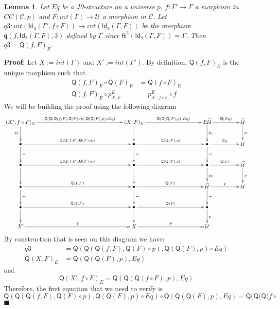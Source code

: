 \documentclass[12pt]{article}
\numberwithin{equation}{section}
\newenvironment{myproof}{{\bf Proof}:}{$\blacksquare$ \vskip 5mm }
\newtheorem{lemma}[proposition]{Lemma}
\newcommand{\llabel}[1]{\label{#1}}
\newcommand{\sr}{\rightarrow}
\newcommand{\wt}{\widetilde}
\newcommand{\BB}{{\bullet}}
\newcommand{\toCC}{CC} %
\newcommand{\C}{{\mathcal C}}  %
\newcommand{\ft}{\mathsf{ft}}
\newcommand{\q}{\mathsf{q}}
\newcommand{\Idx}{\mathsf{Id_3}} %
\newcommand{\U}{\mathcal{U}}
\newcommand{\Q}{\mathsf{Q}}
\begin{document}
\begin{lemma}
\llabel{2015.04.04.l4} Let $Eq$ be a J0-structure on a universe $p$,
$f:\Gamma'\sr \Gamma$ a morphism in $\toCC({\C},p)$ and $F:int(\Gamma)\sr
\U$ a morphism in $\C$.  Let $q3:int(\Idx(\Gamma',f\circ F))\sr
int(\Idx(\Gamma,F))$ be the morphism $\q(f,\Idx(\Gamma,F),3)$ defined by
$\Gamma$ since $\ft^3(\Idx(\Gamma,F))=\Gamma$. Then $q3=\Q(f,F)_{E}$.
\end{lemma}
%
\begin{myproof}
Let $X:=int(\Gamma)$ and $X':=int(\Gamma')$. By definition, $\Q(f,F)_{E}$ is the
unique morphism such that
%
\begin{align*}
  \Q(f,F)_{E}\circ \Q(F)_{E}&=\Q(f\circ F)_{E} \\
  \Q(f,F)_{E}\circ p^{E}_{X,F}&=p^{E}_{X',f\circ F}\circ f
\end{align*}
%
We will be building the proof using the following diagram
%
$$
\begin{xy}
          \xymatrix@C=4pc{ (X',f\circ F)_{E} \ar[rrr]^-{\Q(\Q(\Q(f,F),\Q(F)\circ
              p),\Q(\Q(F),p)\circ Eq)} \ar[d]_{p_3} &&& (X;F)_{E}
            \ar[rr]^-{\Q(\Q(\Q(F),p),Eq)} \ar[d] && E\wt{\U} \ar[r]^-{\Q(Eq)}
            \ar[d]^{p_1} & \wt{\U} \ar[d]^{p}\\ \BB
            \ar[rrr]^-{\Q(\Q(f,F),\Q(F)\circ p)} \ar[d]^{=} &&& \BB
            \ar[rr]^-{\Q(\Q(F),p)} \ar[d]^{=} && \BB \ar[r]^-{Eq} \ar[d]^{=}&
            \U\\ \BB \ar[rrr]^-{\Q(\Q(f,F),\Q(F)\circ p)} \ar[d] &&& \BB
            \ar[rr]^-{\Q(\Q(F),p)} \ar[d] && \BB \ar[r]^-{\Q(p)} \ar[d]^{p_2}&
            \wt{\U} \ar[d]^{p}\\ \BB \ar[rrr]^-{\Q(f,F)} \ar[d]^{=}&&& \BB
            \ar[rr]^-{\Q(F)} \ar[d]^{=} && \wt{\U} \ar[r]^-{p} \ar[d]^{=} & \U
            \\ \BB \ar[rrr]^-{\Q(f,F)} \ar[d] &&& \BB \ar[rr]^-{\Q(F)} \ar[d] &&
            \BB \ar[d]^{p}\\ X' \ar[rrr]^-{f} &&& X \ar[rr]^-{F} && \U }
\end{xy}
$$
%
By construction that is seen on this diagram we have:
%
\begin{align*}
  q3&=\Q(\Q(\Q(f,F),\Q(F)\circ p),\Q(\Q(F),p)\circ Eq) \\
  \Q(X,F)_{E}&=\Q(\Q(\Q(F),p),Eq)
\end{align*}
%
and
%
$$\Q(X', f\circ F)_{E}=\Q(\Q(\Q(f\circ F),p),Eq)$$
%
Therefore, the first equation that we need to verify is
%
$$\Q(\Q(\Q(f,F),\Q(F)\circ p),\Q(\Q(F),p)\circ Eq)\circ \Q(\Q(\Q(F),p),Eq)=\Q(\Q(\Q(f\circ
$$
\end{myproof}
\end{document}
